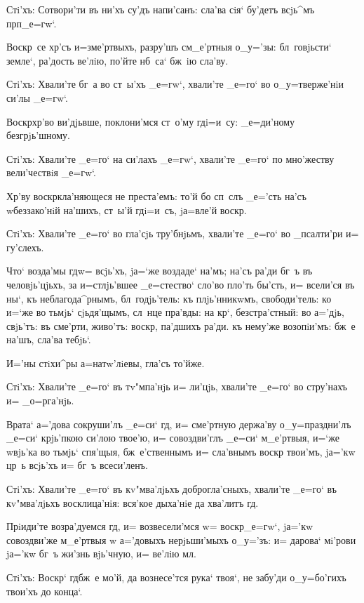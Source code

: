 Стi'хъ: Сотвори'ти въ ни'хъ су'дъ напи'санъ: сла'ва 
сiя` бу'детъ всjь^мъ прп _е=гw`.

Воскр~се хр'съ и=з\ъ ме'ртвыхъ, разру'шъ 
см_е'ртныя о_у='зы: бл~говjьсти` земле`, ра'дость ве'лiю, 
по'йте нб~са` бж~iю сла'ву.

Стi'хъ: Хвали'те бг~а во ст~ы'хъ _е=гw`, хвали'те 
_е=го` во о_у=тверже'нiи си'лы _е=гw`.

Воскр хр'во ви'дjьвше, поклони'мся ст~о'му 
гд i=и~су: _е=ди'ному безгрjь'шному.

Стi'хъ: Хвали'те _е=го` на си'лахъ _е=гw`, хвали'те 
_е=го` по мно'жеству вели'чествiя _е=гw`.

Хр'ву воскр кла'няющеся не преста'емъ: то'й 
бо сп~слъ _е='сть на'съ w\т беззако'нiй на'шихъ, ст~ы'й 
гд i=и~съ, jа=вле'й воскр.

Стi'хъ: Хвали'те _е=го` во гла'сjь тру'бнjьмъ, 
хвали'те _е=го` во _псалти'ри и= гу'слехъ.

Что` возда'мы гд w= всjь'хъ, jа=`же воздаде` 
на'мъ; на'съ ра'ди бг~ъ въ человjь'цjьхъ, за и=стлjь'вшее 
_е=стество` сло'во пло'ть бы'сть, и= всели'ся въ ны`, къ 
неблагода^рнымъ, бл~годjь'тель: къ плjь'нникwмъ, 
свободи'тель: ко и=`же во тьмjь` сjьдя'щымъ, сл~нце 
пра'вды: на кр`, безстра'стный: во а='дjь, свjь'тъ: 
въ сме'рти, живо'тъ: воскр, па'дшихъ ра'ди. къ 
нему'же возопiи'мъ: бж~е на'шъ, сла'ва тебjь`.

И='ны стiхи^ры а=натw'лiевы, гла'съ то'йже.

Стi'хъ: Хвали'те _е=го` въ тv"мпа'нjь и= ли'цjь, 
хвали'те _е=го` во стру'нахъ и= _о=рга'нjь.

Врата` а='дова сокруши'лъ _е=си` гд, и= сме'ртную 
держа'ву о_у=праздни'лъ _е=си` крjь'пкою си'лою твое'ю, 
и= совоздви'глъ _е=си` м_е'ртвыя, и=`же w\т вjь'ка во 
тьмjь` спя'щыя, бж~е'ственнымъ и= сла'внымъ воскр 
твои'мъ, jа='кw цр~ь всjь'хъ и= бг~ъ всеси'ленъ.

Стi'хъ: Хвали'те _е=го` въ кv"мва'лjьхъ 
доброгла'сныхъ, хвали'те _е=го` въ кv"мва'лjьхъ 
восклица'нiя: вся'кое дыха'нiе да хва'литъ гд.

Прiиди'те возра'дуемся гд, и= возвесели'мся w= 
воскр _е=гw`, jа='кw совоздви'же м_е'ртвыя w\т 
а='довыхъ нерjьши'мыхъ о_у='зъ: и= дарова` мi'рови jа='кw 
бг~ъ жи'знь вjь'чную, и= ве'лiю мл.

Стi'хъ: Воскр` гд бж~е мо'й, да вознесе'тся 
рука` твоя`, не забу'ди о_у=бо'гихъ твои'хъ до конца`.

